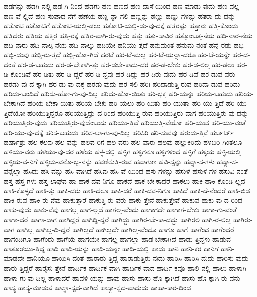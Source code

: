 {ಹಡಗನ್ನು
ಹಡಗಿ-ನಲ್ಲಿ
ಹಡ-ಗಿ-ನಿಂದ
ಹಡಗು
ಹಣ
ಹಣದ
ಹಣ-ದಾಸೆ-ಯಿಂದ
ಹಣ-ಮಾಡು-ವುದು
ಹಣ-ವಲ್ಲ
ಹಣ-ವೆ-ಲ್ಲಿದೆ
ಹಣ-ಸಂಪಾದ-ನೆಗೆ
ಹಣೆಯ
ಹಣ್ಣ-ನ್ನಾ-ಗಲಿ
ಹಣ್ಣನ್ನು
ಹಣ್ಣು
ಹಣ್ಣು-ಗಳನ್ನು
ಹತರಾ-ದು-ದನ್ನು
ಹತೋಟಿ
ಹತೋಟಿಗೆ
ಹತೋಟಿ-ಯಲ್ಲಿ-ಡಲು
ಹತೋಟಿ-ಯಲ್ಲಿ-ಡು-ವು-ದಕ್ಕೆ
ಹತ್ತರಷ್ಟು
ಹತ್ತಾರು
ಹತ್ತಿ-ಕೊಂಡು
ಹತ್ತಿದರು
ಹತ್ತಿಯ
ಹತ್ತಿರ
ಹತ್ತಿ-ರಕ್ಕೆ
ಹತ್ತಿರ-ವಾಗಿ-ರು-ವುದು
ಹತ್ತು
ಹತ್ತು-ಸಾವಿರ
ಹತ್ತೊಂಬತ್ತ-ನೆಯ
ಹದಿ-ನಾರ-ನೆಯ
ಹದಿ-ನಾರು
ಹದಿ-ನಾಲ್ಕ-ನೆಯ
ಹದಿ-ನಾಲ್ಕು
ಹದಿಯೇ
ಹನಿಯು-ತ್ತದೆ
ಹನುಮಂತ
ಹನುಮ-ನಂತೆ
ಹನ್ನೆ-ರಡು
ಹಬ್ಬಿ
ಹಬ್ಬಿ-ದುವು
ಹಬ್ಬಿ-ರು-ತ್ತದೆ
ಹಬ್ಬಿ-ಹೋ-ಗಿದೆ
ಹರಟೆ
ಹರ-ಟೆ-ಮಲ್ಲ
ಹರ-ಟೆ-ಯನ್ನಾ-ದರೂ
ಹರ-ಟೆ-ಯನ್ನೇ
ಹರ-ಡ-ದಂತೆ
ಹರ-ಡ-ಬಹುದು
ಹರ-ಡ-ಬೇಕಾಗಿ-ತ್ತು
ಹರ-ಡಬೇ-ಕಾದು-ದರ
ಹರ-ಡ-ಬೇಕು
ಹರ-ಡ-ಲಿಲ್ಲ
ಹರ-ಡಲು
ಹರ-ಡಿ-ಕೊಂಡಿವೆ
ಹರ-ಡಿತು
ಹರ-ಡಿ-ದ್ದರೆ
ಹರ-ಡಿ-ದ್ದವು
ಹರ-ಡಿದ್ದು
ಹರ-ಡಿರು-ವುದು
ಹರ-ಡಿವೆ
ಹರ-ಡುವ-ವರು
ಹರಡು-ವು-ದ-ಕ್ಕಾಗಿ
ಹರ-ಡು-ವು-ದಕ್ಕೆ
ಹರಡು-ವುದು
ಹರ-ಸಲಿ
ಹರಿಃ
ಹರಿದಾಡುತ್ತಿ-ರುವ
ಹರಿದಾ-ಡುವ
ಹರಿದು
ಹರಿದು-ಬಂದಿದೆ
ಹರಿದು-ಹೋ-ಗು-ವು-ದಿಲ್ಲ
ಹರಿದು-ಹೋ-ಯಿತು
ಹರಿ-ಭಕ್ತ
ಹರಿ-ಯನ್ನು
ಹರಿಯ-ಬಹುದು
ಹರಿಯ-ಬೇಕಾಗಿದೆ
ಹರಿಯ-ಬೇಕಾ-ಯಿತು
ಹರಿಯ-ಬೇಕು
ಹರಿ-ಯಲು
ಹರಿ-ಯಿತು
ಹರಿ-ಯುತ್ತಾ
ಹರಿ-ಯು-ತ್ತಿದೆ
ಹರಿ-ಯು-ತ್ತಿದೆಯೋ
ಹರಿಯುತ್ತಿದ್ದರೂ
ಹರಿಯುತ್ತಿದ್ದು-ದ-ರಿಂದ
ಹರಿಯುತ್ತಿ-ರುವ
ಹರಿಯುತ್ತಿರು-ವಾಗ
ಹರಿಯುತ್ತಿರು-ವು-ದನ್ನು
ಹರಿಯುತ್ತಿರು-ವುದು
ಹರಿಯುತ್ತಿರು-ವುದೆಂಬುದು
ಹರಿಯು-ತ್ತಿವೆ
ಹರಿಯುತ್ತಿ-ವೆಯೋ
ಹರಿ-ಯುವ
ಹರಿ-ಯು-ವಂತೆ
ಹರಿ-ಯು-ವು-ದಕ್ಕೆ
ಹರಿಸ-ಬಹುದು
ಹರಿಸ-ಲಾ-ಗು-ವು-ದಿಲ್ಲ
ಹರಿಸಿರಿ
ಹರಿ-ಸುವವು
ಹರುಡು-ತ್ತಿವೆ
ಹರ್ಬರ್ಟ್
ಹರ್ಷಾಶ್ರು
ಹಲ-ಕೆಲವು
ಹಲ-ವನ್ನು
ಹಲವ-ರಿಗೆ
ಹಲ-ವರು
ಹಲ-ವಾರು
ಹಲವು
ಹಲ್ಲುಕಿರಿದು
ಹಳಬರಿ-ಗಿಂತಲೂ
ಹಳಿಯು-ವರು
ಹಳಿಯು-ವು-ದರ
ಹಳೆಯ
ಹಳ್ಳ-ದಲ್ಲಿ
ಹಳ್ಳಿಗ
ಹಳ್ಳಿಗನೂ
ಹಳ್ಳಿಗಳಿಂದ
ಹಳ್ಳಿಗೆ
ಹಳ್ಳಿಯ
ಹಳ್ಳಿ-ಯಲ್ಲಿ
ಹಳ್ಳಿಯ-ವ-ನಿಗೆ
ಹಳ್ಳಿಯ-ವನೊ-ಬ್ಬ-ನನ್ನು
ಹವಣಿಸುತ್ತಿ-ರುವ
ಹವಾಗುಣ
ಹವಿ-ಸ್ಸನ್ನು
ಹವ್ಯಾ-ಸ-ಗಳು
ಹವ್ಯಾ-ಸ-ವನ್ನೆಲ್ಲಾ
ಹಸಿದು
ಹಸಿ-ವನ್ನು
ಹಸಿ-ವಾಗಿದೆ
ಹಸಿವು
ಹಸಿ-ವೆ-ಯಿಂದ
ಹಸು-ಗಳನ್ನು
ಹಸುಳೆ
ಹಸುಳೆ-ಗಳ
ಹಸುವಿ-ನಂತೆ
ಹಸ್ತ
ಹಸ್ತ-ಗಳು
ಹಸ್ತ-ಲಾಘವ
ಹಾ
ಹಾಕ-ದವ-ನಿಗೂ
ಹಾಕದೆ
ಹಾಕ-ಬೇ-ಕಾದರೆ
ಹಾಕಲು
ಹಾಕಿ
ಹಾಕಿ-ಕೊಂಡಿ-ಲ್ಲದ
ಹಾಕಿ-ಕೊಳ್ಳದೆ
ಹಾಕಿ-ತ್ತು
ಹಾಕಿ-ದರು
ಹಾಕಿ-ದರೂ
ಹಾಕಿ-ದರೆ
ಹಾಕಿ-ದವ-ನಿಗೂ
ಹಾಕಿದೆ
ಹಾಕಿ-ದೆ-ನೆಂದರೆ
ಹಾಕಿ-ಬಿಡ
ಹಾಕಿ-ರುವ
ಹಾಕಿ-ರು-ವೆವು
ಹಾಕುತ್ತಾರೆ
ಹಾಕುತ್ತಿ-ರು-ವರು
ಹಾಕು-ತ್ತೇನೆ
ಹಾಕುತ್ತೇವೆ
ಹಾಕುವ
ಹಾಕು-ವು-ದ-ರಿಂದ
ಹಾಕು-ವುದು
ಹಾಕು-ವೆವು
ಹಾಗಲ್ಲ
ಹಾಗ-ಲ್ಲದೆ
ಹಾಗಲ್ಲ-ವೆಂದು
ಹಾಗಾಗದೇ
ಹಾಗಾಗ-ಬೇಕು
ಹಾಗಾ-ಗು-ವಂತೆ
ಹಾಗಾ-ದರೆ
ಹಾಗಾ-ದಾಗ
ಹಾಗಿದ್ದರೆ
ಹಾಗಿದ್ದಿ-ದ್ದರೆ
ಹಾಗಿದ್ದು
ಹಾಗಿರ-ಬೇ-ಕಾ-ದದ್ದು
ಹಾಗಿರಲಿ
ಹಾಗಿ-ರ-ಲಿಲ್ಲ
ಹಾಗಿರು-ವಾಗ
ಹಾಗಿಲ್ಲ
ಹಾಗಿಲ್ಲ-ದಿ-ದ್ದರೆ
ಹಾಗಿಲ್ಲದೆ
ಹಾಗಿಲ್ಲದೇ
ಹಾಗಿಲ್ಲ-ವೆಂದೂ
ಹಾಗೂ
ಹಾಗೆ
ಹಾಗೆಂದ
ಹಾಗೆಂದರೆ
ಹಾಗೆಂದಿಗೂ
ಹಾಗೆಂದು
ಹಾಗೆಯೆ
ಹಾಗೆಯೇ
ಹಾಗೆಲ್ಲ
ಹಾಗೆಲ್ಲಾ
ಹಾಡ-ಬೇಕಾಗಿದೆ
ಹಾಡು-ತ್ತಿದ್ದಳು
ಹಾಡುವ
ಹಾತೊರೆಯು-ತ್ತಿದ್ದ
ಹಾದಿ
ಹಾದಿ-ಯನ್ನು
ಹಾದಿ-ಯನ್ನೇ
ಹಾದಿ-ಯಲ್ಲಿ
ಹಾದು
ಹಾನಿ
ಹಾನಿ-ಕರ
ಹಾನಿಗೆ
ಹಾನಿ-ಮಾಡದೇ
ಹಾನಿಯೂ
ಹಾಯಿಸಿ-ದಂತೆ
ಹಾರಾಡು-ತ್ತಿದ್ದ
ಹಾರಾಡುತ್ತಿರು-ವುದು
ಹಾರಿಸಿ
ಹಾರಿಸಿ-ದುದು
ಹಾರಿಸು-ವುದು
ಹಾರು-ತ್ತಿದ್ದರೆ
ಹಾರೈಸು-ತ್ತೇನೆ
ಹಾರ್ದಿಕ
ಹಾರ್ದಿಕ-ವಾಗಿ
ಹಾರ್ದಿಕ-ವಾದ
ಹಾರ್ದಿ-ಕವೂ
ಹಾಲಿ-ನಲ್ಲಿ
ಹಾಲು
ಹಾಳಾಗಿ
ಹಾಳಾ-ಗು-ವು-ದಿಲ್ಲ
ಹಾಳಾದರೆ
ಹಾವಳಿ-ಯನ್ನು
ಹಾವು
ಹಾಸು
ಹಾಸು-ಹೊ-ಕ್ಕಾಗಿದೆ
ಹಾಸು-ಹೊ-ಕ್ಕಾಗಿ-ರು-ವನು
ಹಾಸ್ಯ
ಹಾಸ್ಯ-ಮಾಡುವ
ಹಾಸ್ಯಾ-ಸ್ಪದ-ವಾಗಿದೆ
ಹಾಸ್ಯಾ-ಸ್ಪದ-ವಾದುದು
ಹಾಹಾ-ಕಾರ-ದಿಂದ
}

